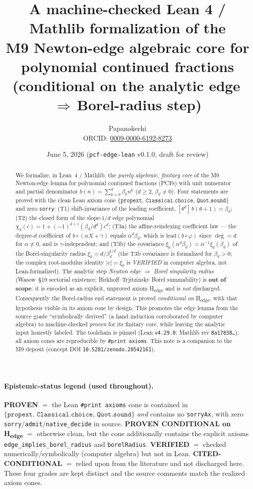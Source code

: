 \documentclass[11pt]{article}
\title{\textbf{A machine-checked Lean 4 / Mathlib formalization of the\\
M9 Newton-edge algebraic core for polynomial continued fractions}\\[4pt]
\large (conditional on the analytic edge\,$\Rightarrow$\,Borel-radius step)}
\author{Papanokechi\\
\small ORCID: \href{https://orcid.org/0009-0000-6192-8273}{0009-0000-6192-8273}}
\date{June 5, 2026 \quad(\texttt{pcf-edge-lean} v0.1.0, draft for review)}
\newcommand{\xizero}{\xi_{0}}
\newcommand{\cone}{\{\texttt{propext},\,\texttt{Classical.choice},\,\texttt{Quot.sound}\}}
\newcommand{\Hedge}{\textsf{H\textsubscript{edge}}}
\begin{document}
\sloppy
\setlength{\emergencystretch}{3em}
\maketitle

\begin{abstract}
\noindent
We formalize, in Lean~4 / Mathlib, the \emph{purely algebraic, finitary core}
of the M9 Newton-edge lemma for polynomial continued fractions (PCFs) with unit
numerator and partial denominator $b(n)=\sum_{k=0}^{d}\beta_k n^k$
($d\ge 2$, $\beta_d\neq 0$). Four statements are proved with the clean Lean
axiom cone $\cone$ and zero \texttt{sorry}: (T1) shift-invariance of the leading
coefficient, $[\theta^d]\,b(\theta+1)=\beta_d$; (T2) the closed form of the
slope-$1/d$ edge polynomial
$\chi_d(c)=1+(-1)^{d+1}(\beta_d/d^{d})c^{d}$; (T3a) the
affine-reindexing coefficient law --- the degree-$d$ coefficient of
$b\circ(\alpha X+\gamma)$ equals $\alpha^{d}\beta_d$, which is
$\mathrm{lead}(b\circ\varphi)$ since $\deg=d$ for $\alpha\neq0$, and is
$\gamma$-independent; and (T3b) the covariance
$\xizero(\alpha^{d}\beta_d)=\alpha^{-1}\xizero(\beta_d)$ of the
Borel-singularity radius $\xizero=d/\beta_d^{1/d}$ (the T3b covariance is
formalized for $\beta_d>0$; the complex root-modulus identity $|c|=\xizero$ is
\emph{VERIFIED} in computer algebra, not Lean-formalized). The analytic step
\emph{Newton edge $\Rightarrow$ Borel singularity radius} (Wasow~\S19 sectorial
existence; Birkhoff--Trjitzinsky Borel summability) is \textbf{out of scope}:
it is encoded as an explicit, unproved axiom \Hedge{} and is \emph{not}
discharged. Consequently the Borel-radius end statement is proved
\emph{conditional on} \Hedge, with that hypothesis visible in its axiom cone by
design. This promotes the edge lemma from the source grade
``symbolically derived'' (a hand induction corroborated by computer algebra) to
machine-checked \emph{proven} for its finitary core, while leaving the analytic
input honestly labeled. The toolchain is pinned (Lean
\texttt{v4.29.0}; Mathlib rev \texttt{8a17838\ldots}); all axiom cones are
reproducible by \texttt{\#print axioms}. This note is a companion to the M9
deposit (concept DOI \texttt{10.5281/zenodo.20542161}).
\end{abstract}

\paragraph{Epistemic-status legend (used throughout).}
\textbf{PROVEN} $=$ the Lean \texttt{\#print axioms} cone is contained in
$\cone$ \emph{and} contains no \texttt{sorryAx}, with zero
\texttt{sorry}/\texttt{admit}/\texttt{native\_decide} in source.
\textbf{PROVEN CONDITIONAL on \Hedge} $=$ otherwise clean, but the cone
additionally contains the explicit axioms \texttt{edge\_implies\_borel\_radius}
and \texttt{borelRadius}. \textbf{VERIFIED} $=$ checked numerically/symbolically
(computer algebra) but not in Lean. \textbf{CITED-CONDITIONAL} $=$ relied upon
from the literature and not discharged here. These four grades are kept
distinct and the source comments match the realized axiom cones.
\end{document}
